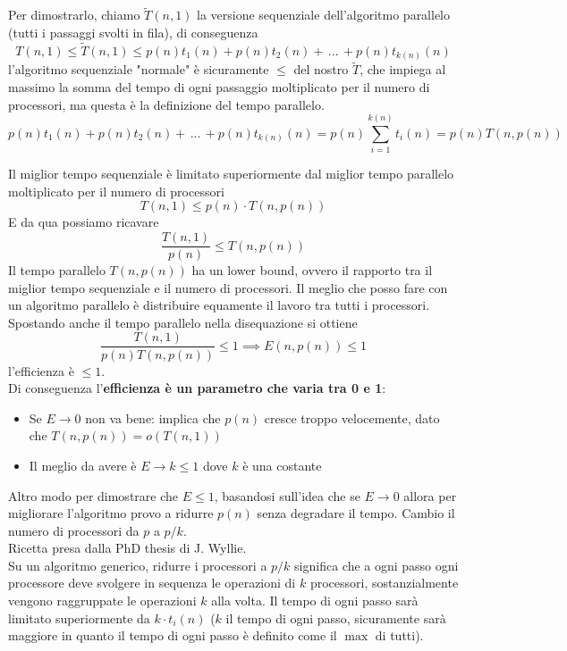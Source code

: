 \documentclass[11pt]{article}
\begin{document}
	\newpage
	
	Per dimostrarlo, chiamo $\tilde{T} (n, 1)$ la versione sequenziale dell'algoritmo parallelo (tutti i passaggi svolti in fila), di conseguenza 
	$$ T(n, 1) \leq \tilde{T} (n,1) \leq p(n) t_1 (n) + p(n) t_2 (n) + \, ... \, + p(n) t_{k(n)} (n) $$
	l'algoritmo sequenziale "normale" è sicuramente $\leq$ del nostro $\tilde{T}$, che impiega al massimo la somma del tempo di ogni passaggio moltiplicato per il numero di processori, ma questa è la definizione del tempo parallelo.\\
	$$ p(n) t_1 (n) + p(n) t_2 (n) + \, ... \, + p(n) t_{k(n)} (n) = p(n) \sum_{i = 1}^{k(n)} t_i (n) = p(n) T(n, p(n)) $$
	
	Il miglior tempo sequenziale è limitato superiormente dal miglior tempo parallelo moltiplicato per il numero di processori
	$$ T(n,1) \leq p(n) \cdot T(n, p(n)) $$
	E da qua possiamo ricavare
	$$ \frac{T(n,1)}{p(n)} \leq T(n, p(n))$$
	Il tempo parallelo $T(n, p(n))$ ha un lower bound, ovvero il rapporto tra il miglior tempo sequenziale e il numero di processori. Il meglio che posso fare con un algoritmo parallelo è distribuire equamente il lavoro tra tutti i processori.\\
	
	Spostando anche il tempo parallelo nella disequazione si ottiene 
	$$ \frac{T(n,1)}{p(n) T(n, p(n))} \leq 1 \implies E(n, p(n)) \leq 1$$
	l'efficienza è $\leq 1$.\\
	 
	Di conseguenza l'\textbf{efficienza è un parametro che varia tra 0 e 1}: 
	\begin{itemize}
		\item Se $E \rightarrow 0$ non va bene: implica che $p(n)$ cresce troppo velocemente, dato che $T(n, p(n)) = o(T(n,1))$
		\item Il meglio da avere è $E \rightarrow k \leq 1$ dove $k$ è una costante
	\end{itemize}
	
	\newpage
	
	Altro modo per dimostrare che $E \leq 1$, basandosi sull'idea che se $E \rightarrow 0$ allora per migliorare l'algoritmo provo a ridurre $p(n)$ senza degradare il tempo. Cambio il numero di processori da $p$ a $p/k$.\\
	
	Ricetta presa dalla PhD thesis di J. Wyllie.\\
	
	Su un algoritmo generico, ridurre i processori a $p/k$ significa che a ogni passo ogni processore deve svolgere in sequenza le operazioni di $k$ processori, sostanzialmente vengono raggruppate le operazioni $k$ alla volta. Il tempo di ogni passo sarà limitato superiormente da $k \cdot t_i(n)$ ($k$ il tempo di ogni passo, sicuramente sarà maggiore in quanto il tempo di ogni passo è definito come il $\max$ di tutti).\\
	
\end{document}
